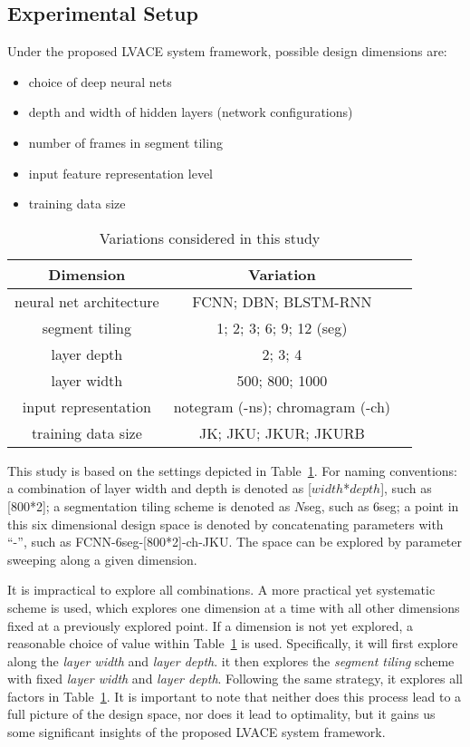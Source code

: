 \subsection{Experimental Setup}
Under the proposed LVACE system framework, possible design dimensions are:
\begin{itemize}
	\item choice of deep neural nets
	\item depth and width of hidden layers (network configurations)
	\item number of frames in segment tiling
	\item input feature representation level
	\item training data size
\end{itemize}

\begin{table}
	\caption{Variations considered in this study}
	\centering
	\footnotesize
	\begin{tabular}{|c|c|c|} \hline
		Dimension & Variation \\ \hline
		neural net architecture & FCNN; DBN; BLSTM-RNN \\ \hline
		segment tiling & 1; 2; 3; 6; 9; 12 (seg) \\ \hline
		layer depth & 2; 3; 4 \\ \hline
		layer width & 500; 800; 1000 \\ \hline
		input representation & notegram (-ns); chromagram (-ch) \\ \hline
		training data size & JK; JKU; JKUR; JKURB \\ \hline
	\end{tabular}
	\label{tab:3-varexplore}
\end{table}

This study is based on the settings depicted in Table~\ref{tab:3-varexplore}. For naming conventions: a combination of layer width and depth is denoted as [$width$*$depth$], such as [800*2]; a segmentation tiling scheme is denoted as $N$seg, such as 6seg; a point in this six dimensional design space is denoted by concatenating parameters with ``-'', such as FCNN-6seg-[800*2]-ch-JKU. The space can be explored by parameter sweeping along a given dimension.

It is impractical to explore all combinations. A more practical yet systematic scheme is used, which explores one dimension at a time with all other dimensions fixed at a previously explored point. If a dimension is not yet explored, a reasonable choice of value within Table~\ref{tab:3-varexplore} is used. Specifically, it will first explore along the {\it layer width} and {\it layer depth}. it then explores the \textit{segment tiling} scheme with fixed {\it layer width} and {\it layer depth}. Following the same strategy, it explores all factors in Table~\ref{tab:3-varexplore}. It is important to note that neither does this process lead to a full picture of the design space, nor does it lead to optimality, but it gains us some significant insights of the proposed LVACE system framework.


